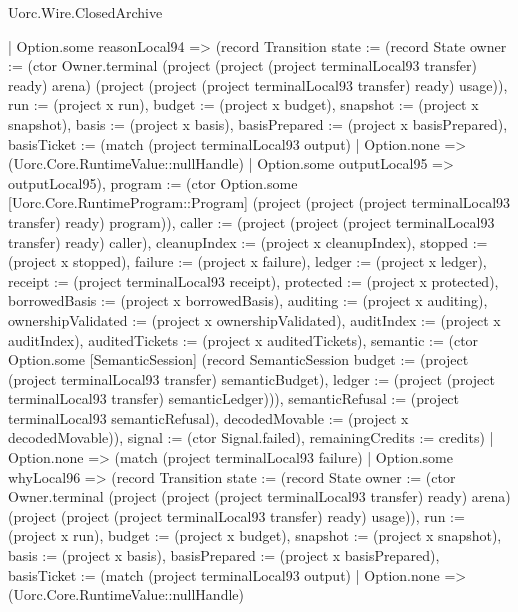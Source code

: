 \begin{lexlean}{Uorc.Wire.ClosedArchive}
\begin{semanticmodule}
{        | Option.some reasonLocal94 => (record Transition {state := (record State {owner := (ctor Owner.terminal (project (project (project terminalLocal93 transfer) ready) arena) (project (project (project terminalLocal93 transfer) ready) usage)), run := (project x run), budget := (project x budget), snapshot := (project x snapshot), basis := (project x basis), basisPrepared := (project x basisPrepared), basisTicket := (match (project terminalLocal93 output)
          | Option.none => (Uorc.Core.RuntimeValue::nullHandle)
          | Option.some outputLocal95 => outputLocal95), program := (ctor Option.some [Uorc.Core.RuntimeProgram::Program] (project (project (project terminalLocal93 transfer) ready) program)), caller := (project (project (project terminalLocal93 transfer) ready) caller), cleanupIndex := (project x cleanupIndex), stopped := (project x stopped), failure := (project x failure), ledger := (project x ledger), receipt := (project terminalLocal93 receipt), protected := (project x protected), borrowedBasis := (project x borrowedBasis), auditing := (project x auditing), ownershipValidated := (project x ownershipValidated), auditIndex := (project x auditIndex), auditedTickets := (project x auditedTickets), semantic := (ctor Option.some [SemanticSession] (record SemanticSession {budget := (project (project terminalLocal93 transfer) semanticBudget), ledger := (project (project terminalLocal93 transfer) semanticLedger)})), semanticRefusal := (project terminalLocal93 semanticRefusal), decodedMovable := (project x decodedMovable)}), signal := (ctor Signal.failed), remainingCredits := credits})
        | Option.none => (match (project terminalLocal93 failure)
          | Option.some whyLocal96 => (record Transition {state := (record State {owner := (ctor Owner.terminal (project (project (project terminalLocal93 transfer) ready) arena) (project (project (project terminalLocal93 transfer) ready) usage)), run := (project x run), budget := (project x budget), snapshot := (project x snapshot), basis := (project x basis), basisPrepared := (project x basisPrepared), basisTicket := (match (project terminalLocal93 output)
            | Option.none => (Uorc.Core.RuntimeValue::nullHandle)
}}}
\end{semanticmodule}
\end{lexlean}
